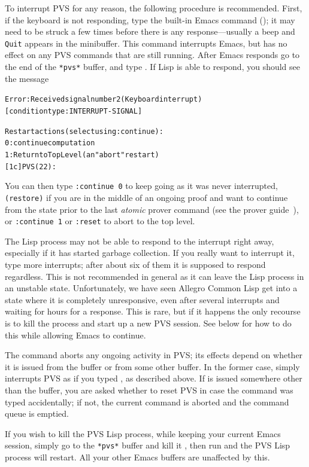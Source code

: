 To interrupt PVS for any reason, the following procedure is recommended.
First, if the keyboard is not responding, type the built-in Emacs
command  (); it may need to be struck a few
times before there is any response---usually a beep and \texttt{Quit}
appears in the minibuffer.  This command interrupts Emacs, but has no
effect on any PVS commands that are still running.  After Emacs responds
go to the end of the \texttt{*pvs*} buffer, and type .  If
Lisp is able to respond, you should see the message
{\small\small
\begin{alltt}
Error: Received signal number 2 (Keyboard interrupt)
  [condition type: INTERRUPT-SIGNAL]

Restart actions (select using :continue):
 0: continue computation
 1: Return to Top Level (an "abort" restart)
[1c] PVS(22):
\end{alltt}}
You can then type \texttt{:continue 0} to keep going as it was never
interrupted, \texttt{(restore)} if you are in the middle of an ongoing
proof and want to continue from the state prior to the last \emph{atomic}
prover command (see the prover guide~\cite{PVS:prover}), or
\texttt{:continue 1} or \texttt{:reset} to abort to the top level.

The Lisp process may not be able to respond to the interrupt right away,
especially if it has started garbage collection.  If you really want to
interrupt it, type more  interrupts; after about six of them
it is supposed to respond regardless.  This is not recommended in general
as it can leave the Lisp process in an unstable state.  Unfortunately, we
have seen Allegro Common Lisp get into a state where it is completely
unresponsive, even after several interrupts and waiting for hours for a
response.  This is rare, but if it happens the only recourse is to kill
the process and start up a new PVS session.  See below for how to do this
while allowing Emacs to continue.

The  command aborts any ongoing activity in PVS; its
effects depend on whether it is issued from the  buffer or
from some other buffer.  In the former case,  simply
interrupts PVS as if you typed , as described above.  If
 is issued somewhere other than the  buffer,
you are asked whether to reset PVS in case the command was typed
accidentally; if not, the current command is aborted and the command queue
is emptied.

If you wish to kill the PVS Lisp process, while keeping your current Emacs
session, simply go to the \texttt{*pvs*} buffer and kill it
 , then run  and the PVS Lisp
process will restart.  All your other Emacs buffers are unaffected by
this.
